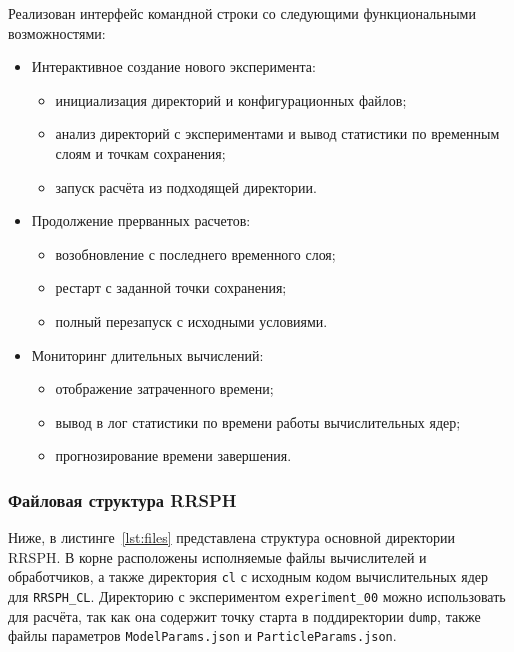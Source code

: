 Реализован интерфейс командной строки со следующими функциональными возможностями:

\begin{itemize}
    \item Интерактивное создание нового эксперимента:
    \begin{itemize}
        \item инициализация директорий и конфигурационных файлов;
        \item анализ директорий с экспериментами и вывод статистики по временным слоям и точкам сохранения;
        \item запуск расчёта из подходящей директории.
    \end{itemize}
    
    \item Продолжение прерванных расчетов:
    \begin{itemize}
        \item возобновление с последнего временного слоя;
        \item рестарт с заданной точки сохранения;
        \item полный перезапуск с исходными условиями.
    \end{itemize}
    
    \item Мониторинг длительных вычислений:
    \begin{itemize}
        \item отображение затраченного времени;
        \item вывод в лог статистики по времени работы вычислительных ядер;
        \item прогнозирование времени завершения.
    \end{itemize}
\end{itemize}

\subsubsection{Файловая структура RRSPH}

Ниже, в листинге~\ref{lst:files} представлена структура основной директории RRSPH. 
%
В корне расположены исполняемые файлы вычислителей и обработчиков, а также
директория \verb|cl| с исходным кодом вычислительных ядер для \verb|RRSPH_CL|.
%
Директорию с экспериментом \verb|experiment_00| можно использовать для расчёта,
так как она содержит точку старта в поддиректории \verb|dump|, 
также файлы параметров \verb|ModelParams.json| и \verb|ParticleParams.json|.


